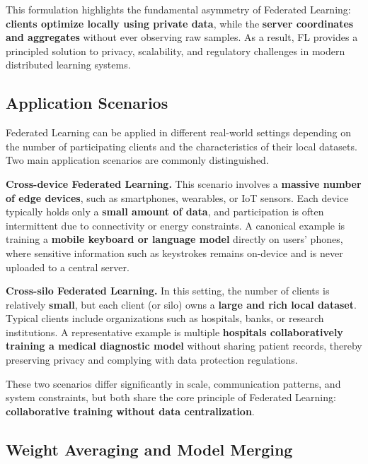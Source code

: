 This formulation highlights the fundamental asymmetry of Federated Learning: \textbf{clients
optimize locally using private data}, while the \textbf{server coordinates and aggregates}
without ever observing raw samples. As a result, FL provides a principled solution to
privacy, scalability, and regulatory challenges in modern distributed learning systems.

\subsection{Application Scenarios}

Federated Learning can be applied in different real-world settings depending on the number
of participating clients and the characteristics of their local datasets. Two main
application scenarios are commonly distinguished.

\begin{compactitemize}
    \item \textbf{Cross-device Federated Learning.}  
    This scenario involves a \textbf{massive number of edge devices}, such as smartphones,
    wearables, or IoT sensors. Each device typically holds only a \textbf{small amount of
    data}, and participation is often intermittent due to connectivity or energy
    constraints.  
    A canonical example is training a \textbf{mobile keyboard or language model} directly
    on users’ phones, where sensitive information such as keystrokes remains on-device and
    is never uploaded to a central server.

    \item \textbf{Cross-silo Federated Learning.}  
    In this setting, the number of clients is relatively \textbf{small}, but each client
    (or silo) owns a \textbf{large and rich local dataset}. Typical clients include
    organizations such as hospitals, banks, or research institutions.  
    A representative example is multiple \textbf{hospitals collaboratively training a
    medical diagnostic model} without sharing patient records, thereby preserving privacy
    and complying with data protection regulations.
\end{compactitemize}

These two scenarios differ significantly in scale, communication patterns, and system
constraints, but both share the core principle of Federated Learning: \textbf{collaborative
training without data centralization}.

\subsection{Weight Averaging and Model Merging}

